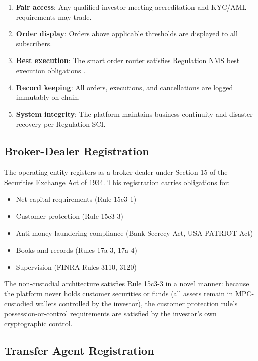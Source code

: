 \documentclass[11pt,a4paper]{article}
\begin{document}
\begin{enumerate}[nosep]
  \item \textbf{Fair access}: Any qualified investor meeting accreditation and KYC/AML requirements may trade.
  \item \textbf{Order display}: Orders above applicable thresholds are displayed to all subscribers.
  \item \textbf{Best execution}: The smart order router satisfies Regulation NMS best execution obligations \cite{lux-smart-order-routing}.
  \item \textbf{Record keeping}: All orders, executions, and cancellations are logged immutably on-chain.
  \item \textbf{System integrity}: The platform maintains business continuity and disaster recovery per Regulation SCI.
\end{enumerate}

\subsection{Broker-Dealer Registration}

The operating entity registers as a broker-dealer under Section 15 of the Securities Exchange Act of 1934. This registration carries obligations for:

\begin{itemize}[nosep]
  \item Net capital requirements (Rule 15c3-1)
  \item Customer protection (Rule 15c3-3)
  \item Anti-money laundering compliance (Bank Secrecy Act, USA PATRIOT Act)
  \item Books and records (Rules 17a-3, 17a-4)
  \item Supervision (FINRA Rules 3110, 3120)
\end{itemize}

The non-custodial architecture satisfies Rule 15c3-3 in a novel manner: because the platform never holds customer securities or funds (all assets remain in MPC-custodied wallets controlled by the investor), the customer protection rule's possession-or-control requirements are satisfied by the investor's own cryptographic control.

\subsection{Transfer Agent Registration}
\end{document}
